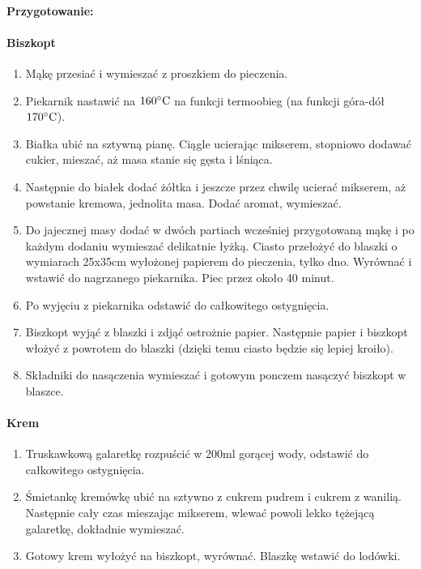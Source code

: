 \documentclass{article}
\begin{document}
    \paragraph{Przygotowanie:}
    \paragraph{Biszkopt}
    \begin{enumerate}
        \item Mąkę przesiać i wymieszać z proszkiem do pieczenia.
        \item Piekarnik nastawić na $160\celsius$ na funkcji termoobieg (na funkcji
            góra-dół $170\celsius$).
        \item Białka ubić na sztywną pianę. Ciągle ucierając mikserem, stopniowo
            dodawać cukier, mieszać, aż masa stanie się gęsta i lśniąca.
        \item Następnie do białek dodać żółtka i jeszcze przez chwilę ucierać
            mikserem, aż powstanie kremowa, jednolita masa. Dodać aromat,
            wymieszać.
        \item Do jajecznej masy dodać w dwóch partiach wcześniej przygotowaną
            mąkę i po każdym dodaniu wymieszać delikatnie łyżką. Ciasto
            przełożyć do blaszki o wymiarach 25x35cm wyłożonej papierem do
            pieczenia, tylko dno. Wyrównać i wstawić do nagrzanego piekarnika.
            Piec przez około 40 minut.
        \item Po wyjęciu z piekarnika odstawić do całkowitego
            ostygnięcia.
        \item Biszkopt wyjąć z blaszki i zdjąć ostrożnie papier.  Następnie
            papier i biszkopt włożyć z powrotem do blaszki (dzięki temu ciasto
            będzie się lepiej kroiło).
        \item Składniki do nasączenia wymieszać i gotowym ponczem nasączyć
            biszkopt w blaszce.
    \end{enumerate}
    \paragraph{Krem}
    \begin{enumerate}
        \item Truskawkową galaretkę rozpuścić w 200ml gorącej wody, odstawić do
            całkowitego ostygnięcia.
        \item Śmietankę kremówkę ubić na sztywno z cukrem pudrem i cukrem z
            wanilią. Następnie cały czas mieszając mikserem, wlewać powoli lekko
            tężejącą galaretkę, dokładnie wymieszać.
        \item Gotowy krem wyłożyć na biszkopt, wyrównać. Blaszkę wstawić do
            lodówki.
    \end{enumerate}
\end{document}
